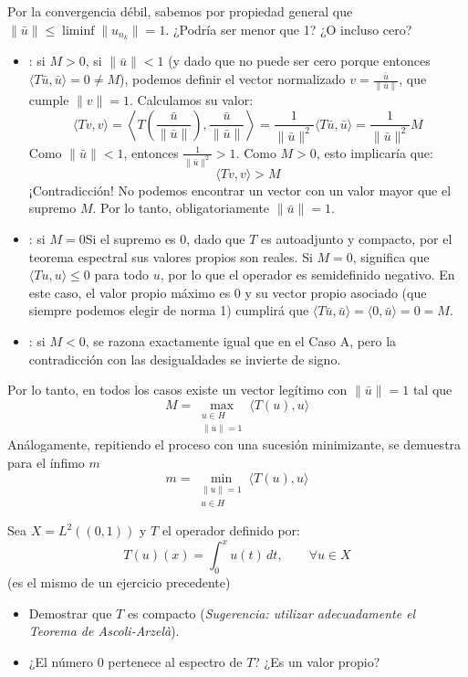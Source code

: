 \begin{ejercicio}
    \noindent
    Por la convergencia débil, sabemos por propiedad general que $\|\bar{u}\| \le \liminf \|u_{n_k}\| = 1$. ¿Podría ser menor que 1? ¿O incluso cero?
    \begin{itemize}
        \item {}: si $M > 0$, si $\|\bar{u}\| < 1$ (y dado que no puede ser cero porque entonces $\langle T\bar{u}, \bar{u} \rangle = 0 \neq M$), podemos definir el vector normalizado $v = \frac{\bar{u}}{\|\bar{u}\|}$, que cumple $\|v\| = 1$. Calculamos su valor:$$\langle Tv, v \rangle = \left\langle T\left(\frac{\bar{u}}{\|\bar{u}\|}\right), \frac{\bar{u}}{\|\bar{u}\|} \right\rangle = \frac{1}{\|\bar{u}\|^2} \langle T\bar{u}, \bar{u} \rangle = \frac{1}{\|\bar{u}\|^2} M$$Como $\|\bar{u}\| < 1$, entonces $\frac{1}{\|\bar{u}\|^2} > 1$. Como $M > 0$, esto implicaría que:$$\langle Tv, v \rangle > M$$¡Contradicción! No podemos encontrar un vector con un valor mayor que el supremo $M$. Por lo tanto, obligatoriamente $\|\bar{u}\| = 1$.
        
        \item {}: si $M = 0$Si el supremo es $0$, dado que $T$ es autoadjunto y compacto, por el teorema espectral sus valores propios son reales. Si $M=0$, significa que $\langle Tu, u \rangle \le 0$ para todo $u$, por lo que el operador es semidefinido negativo. En este caso, el valor propio máximo es $0$ y su vector propio asociado (que siempre podemos elegir de norma 1) cumplirá que $\langle T\bar{u}, \bar{u} \rangle = \langle 0, \bar{u} \rangle = 0 = M$.
        
        \item {}: si $M < 0$, se razona exactamente igual que en el Caso A, pero la contradicción con las desigualdades se invierte de signo.
    \end{itemize}
    Por lo tanto, en todos los casos existe un vector legítimo con $\|\bar{u}\| = 1$ tal que
    $$M = \max_{\substack{u \in H \\ \|u\|=1}} \langle T(u), u \rangle$$
    Análogamente, repitiendo el proceso con una sucesión minimizante, se demuestra para el ínfimo $m$
    $$m = \min_{\substack{\|u\|=1 \\ u \in H}} \langle T(u), u \rangle$$
\end{ejercicio}


\begin{ejercicio} %
    Sea $X = L^2((0,1))$ y $T$ el operador definido por:
    \[ T(u)(x) = \int_{0}^{x} u(t) \, dt, \qquad \forall u \in X \]
    (es el mismo de un ejercicio precedente)

    \begin{itemize}
        \item[i)] Demostrar que $T$ es compacto (\textit{Sugerencia: utilizar adecuadamente el Teorema de Ascoli-Arzelà}).
        
        \item[ii)] ¿El número $0$ pertenece al espectro de $T$? ¿Es un valor propio?
    \end{itemize}
\end{ejercicio}

